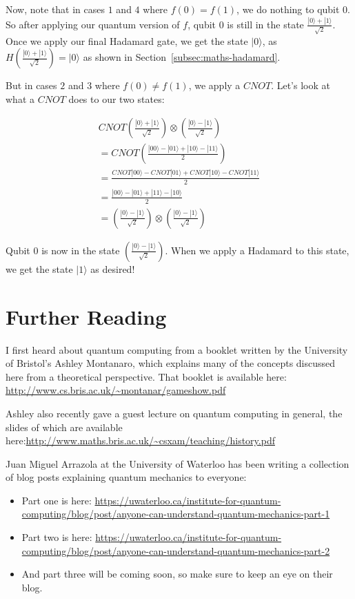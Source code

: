 \documentclass[twocolumn]{article}
\begin{document}
Now, note that in cases $1$ and $4$ where $f(0) = f(1)$, we do nothing to qubit $0$. So after applying our quantum version of $f$, qubit $0$ is still in the state $\frac{|0\rangle + |1\rangle}{\sqrt{2}}$. Once we apply our final Hadamard gate, we get the state $|0\rangle$, as $H(\frac{|0\rangle + |1\rangle}{\sqrt{2}}) = |0\rangle$ as shown in Section~\ref{subsec:maths-hadamard}.

But in cases $2$ and $3$ where $f(0) \neq f(1)$, we apply a $CNOT$. Let's look at what a $CNOT$ does to our two states:

\begin{gather*}
CNOT\left(\frac{|0\rangle + |1\rangle}{\sqrt{2}}\right) \otimes \left(\frac{|0\rangle - |1\rangle}{\sqrt{2}}\right)\\
= CNOT\left(\frac{|00\rangle - |01\rangle + |10\rangle - |11\rangle}{2}\right)\\
= \frac{CNOT|00\rangle - CNOT|01\rangle + CNOT|10\rangle - CNOT|11\rangle}{2}\\
= \frac{|00\rangle - |01\rangle + |11\rangle - |10\rangle}{2}\\
= \left(\frac{|0\rangle - |1\rangle}{\sqrt{2}}\right) \otimes \left(\frac{|0\rangle - |1\rangle}{\sqrt{2}}\right)
\end{gather*}

Qubit $0$ is now in the state $(\frac{|0\rangle - |1\rangle}{\sqrt{2}})$. When we apply a Hadamard to this state, we get the state $|1\rangle$ as desired!

\section{Further Reading}
\label{sec:further-reading}

I first heard about quantum computing from a booklet written by the University of Bristol's Ashley Montanaro, which explains many of the concepts discussed here from a theoretical perspective. That booklet is available here: \url{http://www.cs.bris.ac.uk/~montanar/gameshow.pdf}

Ashley also recently gave a guest lecture on quantum computing in general, the slides of which are available here:\url{http://www.maths.bris.ac.uk/~csxam/teaching/history.pdf}

Juan Miguel Arrazola at the University of Waterloo has been writing a collection of blog posts explaining quantum mechanics to everyone:

\begin{itemize}
\item Part one is here: \url{https://uwaterloo.ca/institute-for-quantum-computing/blog/post/anyone-can-understand-quantum-mechanics-part-1}
\item Part two is here: \url{https://uwaterloo.ca/institute-for-quantum-computing/blog/post/anyone-can-understand-quantum-mechanics-part-2}
\item And part three will be coming soon, so make sure to keep an eye on their blog.
\end{itemize}
\end{document}
